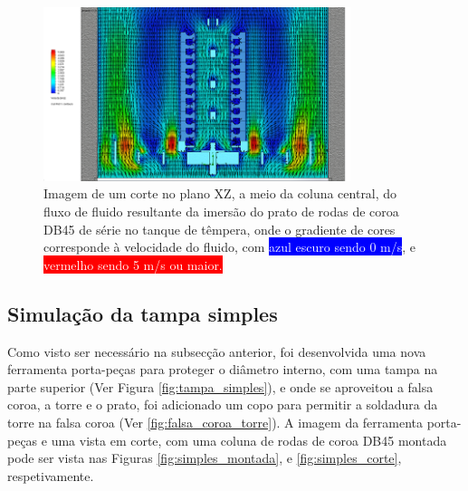 \begin{figure}[htb]
    \centering
    \includegraphics[width = 0.8\textwidth]{Figures/Cap3/resultado_serie.png}
    \caption[Resultado da simulação CFD da têmpera das rodas de coroa de série]%
    {Imagem de um corte no plano XZ, a meio da coluna central, do fluxo de fluido resultante da imersão do prato de rodas de coroa DB45 de série no tanque de têmpera, onde o gradiente de cores corresponde à velocidade do fluido, com \colorbox{Blue}{\textcolor{White}{azul escuro sendo 0 m/s}}, e \colorbox{Red}{\textcolor{White}{vermelho sendo 5 m/s ou maior.}}}
    \label{fig:resultado_serie}
\end{figure}
\subsection{Simulação da tampa simples}  \label{ssec:materiais_concecao_simples}
Como visto ser necessário na subsecção anterior, foi desenvolvida uma nova ferramenta porta-peças para proteger o diâmetro interno, com uma tampa na parte superior (Ver Figura \ref{fig:tampa_simples}), e onde se aproveitou a falsa coroa, a torre e o prato, foi adicionado um copo para permitir a soldadura da torre na falsa coroa (Ver \ref{fig:falsa_coroa_torre}). A imagem da ferramenta porta-peças e uma vista em corte, com uma coluna de rodas de coroa DB45 montada pode ser vista nas Figuras \ref{fig:simples_montada}, e \ref{fig:simples_corte}, respetivamente.

